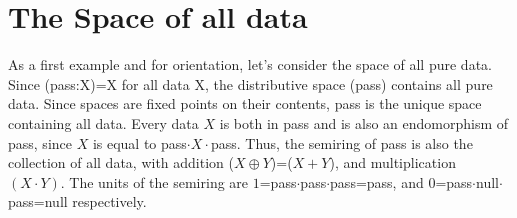 \documentclass[11pt]{article}
\begin{document}
\section{The Space of all data} 

     As a first example and for orientation, let's consider the space of all pure data.  Since (pass:X)=X for all data X, the distributive space (pass) 
contains all pure data.  Since spaces are fixed points on their contents, pass is the unique space containing all data.  Every data $X$ is both in pass
and is also an endomorphism of pass, since $X$ is equal to pass$\cdot X\cdot$pass.  Thus, the semiring of pass is also the collection of all data, with 
addition ($X\oplus Y$)=($X+Y$), and multiplication $(X\cdot Y)$.  The units of the semiring are $1$=pass$\cdot$pass$\cdot$pass=pass, 
and $0$=pass$\cdot$null$\cdot$pass=null respectively.   
\end{document}
